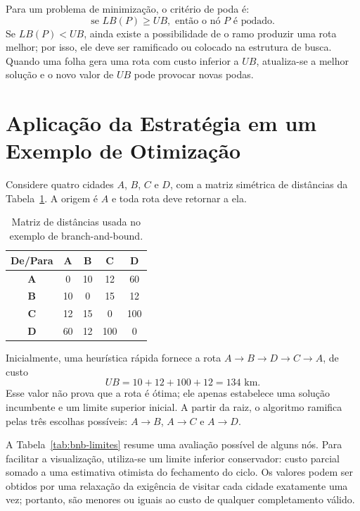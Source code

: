 Para um problema de minimização, o critério de poda é:
\begin{equation}
    \text{se } LB(P) \geq UB, \text{ então o nó } P \text{ é podado.}
\end{equation}
Se $LB(P) < UB$, ainda existe a possibilidade de o ramo produzir uma rota melhor; por isso, ele deve ser ramificado ou colocado na estrutura de busca. Quando uma folha gera uma rota com custo inferior a $UB$, atualiza-se a melhor solução e o novo valor de $UB$ pode provocar novas podas.

\section{Aplicação da Estratégia em um Exemplo de Otimização}

Considere quatro cidades $A$, $B$, $C$ e $D$, com a matriz simétrica de distâncias da Tabela~\ref{tab:bnb-matriz}. A origem é $A$ e toda rota deve retornar a ela.

\begin{table}[htb]
\centering
\caption{Matriz de distâncias usada no exemplo de branch-and-bound.}
\label{tab:bnb-matriz}
\renewcommand{\arraystretch}{1.2}
\begin{tabular}{|c|c|c|c|c|}
\hline
\rowcolor{gray!20}
\textbf{De/Para} & \textbf{A} & \textbf{B} & \textbf{C} & \textbf{D} \\ \hline
\textbf{A} & 0 & 10 & 12 & 60 \\ \hline
\textbf{B} & 10 & 0 & 15 & 12 \\ \hline
\textbf{C} & 12 & 15 & 0 & 100 \\ \hline
\textbf{D} & 60 & 12 & 100 & 0 \\ \hline
\end{tabular}
\end{table}

Inicialmente, uma heurística rápida fornece a rota $A \rightarrow B \rightarrow D \rightarrow C \rightarrow A$, de custo
\begin{equation}
    UB = 10 + 12 + 100 + 12 = 134\text{ km}.
\end{equation}
Esse valor não prova que a rota é ótima; ele apenas estabelece uma solução incumbente e um limite superior inicial. A partir da raiz, o algoritmo ramifica pelas três escolhas possíveis: $A \rightarrow B$, $A \rightarrow C$ e $A \rightarrow D$.

A Tabela~\ref{tab:bnb-limites} resume uma avaliação possível de alguns nós. Para facilitar a visualização, utiliza-se um limite inferior conservador: custo parcial somado a uma estimativa otimista do fechamento do ciclo. Os valores podem ser obtidos por uma relaxação da exigência de visitar cada cidade exatamente uma vez; portanto, são menores ou iguais ao custo de qualquer completamento válido.

